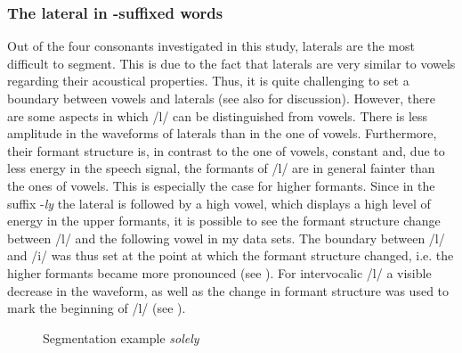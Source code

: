 \subsubsection{The lateral in -suffixed words} \label{ly-segmentation}

Out of the four consonants investigated in this study, laterals are the most difficult to segment. This is due to the fact that laterals are very similar to vowels regarding their acoustical properties. Thus, it is quite challenging to set a boundary between vowels and laterals (see also \citealt[chapter 7]{Machac.2009} for discussion). However, there are some aspects in which /l/ can be distinguished from vowels. There is less amplitude in the waveforms of laterals than in the one of vowels.  Furthermore, their formant structure is, in contrast to the one of vowels, constant and, due to less energy in the speech signal, the formants of /l/ are in general fainter than the ones of vowels. This is especially the case for higher formants. Since in the suffix -\textit{ly} the lateral is followed by a high vowel, which displays a high level of energy in the upper formants, it is possible to see the formant structure change between /l/ and the following vowel in my data sets. The boundary between /l/ and /i/ was thus set at the point at which the formant structure changed, i.e. the higher formants became more pronounced (see ). For intervocalic /l/ a visible decrease in the waveform, as well as the change in formant structure was used to mark the beginning of /l/ (see ).
 
\begin{figure}  
	
	\caption{Segmentation example \textit{solely}}
	\label{fig:segmentation solely}
\end{figure}


